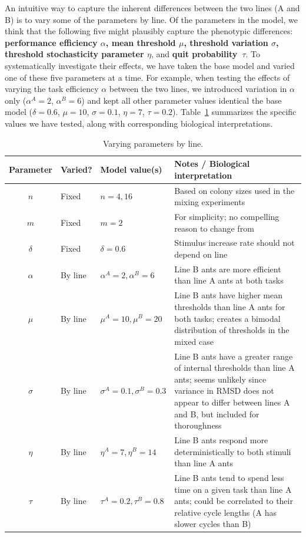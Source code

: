 \documentclass[11pt]{article}
\begin{document}
An intuitive way to capture the inherent differences between the two lines (A and B) is to vary some of the parameters by line. Of the parameters in the model, we think that the following five might plausibly capture the phenotypic differences: \textbf{ performance efficiency $\alpha$, mean threshold $\mu$, threshold variation $\sigma$, threshold stochasticity parameter $\eta$}, and \textbf{quit probability~$\tau$}. To systematically investigate their effects, we have taken the base model and varied one of these five parameters at a time. For example, when testing the effects of varying the task efficiency $\alpha$ between the two lines, we introduced variation in $\alpha$ only ($\alpha^A = 2$, $\alpha^B = 6$) and kept all other parameter values identical the base model ($\delta = 0.6$, $\mu = 10$, $\sigma = 0.1$, $\eta = 7$, $\tau = 0.2$). Table~\ref{tab:byline} summarizes the specific values we have tested, along with corresponding biological interpretations.

\begin{table}[h] \small
  \begin{center}
    \begin{tabular}{|c|>{\centering}m{0.6in}|>{\centering}m{1.15in}|m{3.5in}|} 
      \hline
      \textbf{Parameter} & \textbf{Varied?} & \textbf{Model value(s)} & \textbf{Notes / Biological interpretation} \\ \hline
      $n$ & Fixed & $n = 4, 16$ & Based on colony sizes used in the mixing experiments \\ \hline
      $m$ & Fixed & $m = 2$ & For simplicity; no compelling reason to change from \cite{ulrich2018} \\ \hline
      $\delta$ & Fixed & $\delta = 0.6$ & Stimulus increase rate should not depend on line\\ \hline
      $\alpha$ & By line  & $\alpha^A = 2,\alpha^B = 6$ & Line B ants are more efficient than line A ants at both tasks \\ \hline
      $\mu$ & By line  & $\mu^A = 10,\mu^B = 20 $ & Line B ants have higher mean thresholds than line A ants for both tasks; creates a bimodal distribution of thresholds in the mixed case \\ \hline
      $\sigma$ & By line & $\sigma^A = 0.1, \sigma^B = 0.3$ & Line B ants have a greater range of internal thresholds than line A ants; seems unlikely since variance in RMSD does not appear to differ between lines A and B, but included for thoroughness \\ \hline
      $\eta$ & By line & $\eta^A = 7, \eta^B = 14 $ &  Line B ants respond more deterministically to both stimuli than line A ants\\ \hline
      $\tau$ & By line & $\tau^A = 0.2,\tau^B = 0.8 $ & Line B ants tend to spend less time on a given task than line A ants; could be correlated to their relative cycle lengths (A has slower cycles than B) \\ \hline
    \end{tabular}
    \caption{Varying parameters by line.\vspace{-15pt}}
    \label{tab:byline}
  \end{center}
\end{table}
\end{document}
